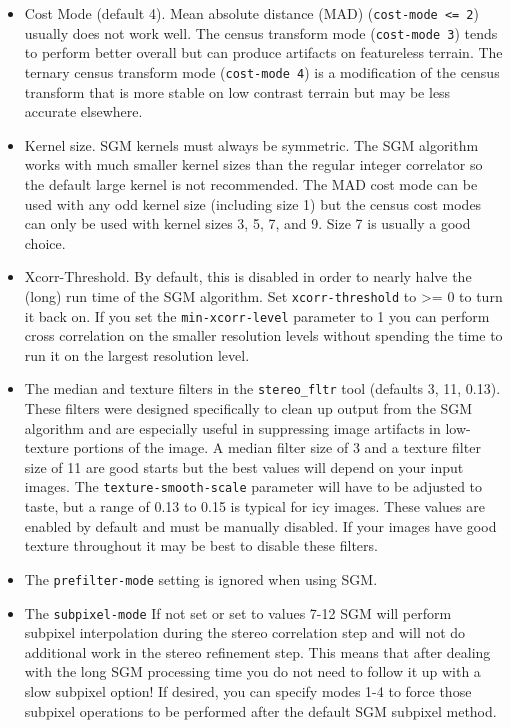 \begin{itemize}
\item Cost Mode (default 4).  Mean absolute distance (MAD) 
(\texttt{cost-mode <= 2}) usually does not work well.  
The census transform mode (\texttt{cost-mode 3}) \citep{zabih1994census} tends to 
perform better overall but can produce artifacts on featureless terrain.  
The ternary census transform mode (\texttt{cost-mode 4}) \citep{hua2016texture} 
is a modification of the census transform that is more stable on low contrast terrain
but may be less accurate elsewhere.
\item Kernel size.  SGM kernels must always be symmetric.
The SGM algorithm works with much smaller kernel sizes than the regular integer 
correlator so the default large kernel is not recommended.
The MAD cost mode can be used with any odd kernel size (including size 1) but the census 
cost modes can only be used with kernel sizes 3, 5, 7, and 9.  Size 7 is usually a good choice.
\item Xcorr-Threshold. By default, this is disabled in order to nearly halve the (long) run time of the SGM
algorithm.  Set \texttt{xcorr-threshold} to >= 0 to turn it back on.  If you set the
\texttt{min-xcorr-level} parameter to 1 you can perform cross correlation on the smaller resolution levels
without spending the time to run it on the largest resolution level.
\item The median and texture filters in the \texttt{stereo\_fltr} tool (defaults 3, 11, 0.13).  These filters
were designed specifically to clean up output from the SGM algorithm and are especially useful in suppressing
image artifacts in low-texture portions of the image.  A median filter size of 3 and a texture filter size of 11
are good starts but the best values will depend on your input images. The \texttt{texture-smooth-scale}
parameter will have to be adjusted to taste, but a range of 0.13 to 0.15 is typical for icy images.  These
values are enabled by default and must be manually disabled.  If your images have good texture throughout
it may be best to disable these filters.
\item The \texttt{prefilter-mode} setting is ignored when using SGM.
\item The \texttt{subpixel-mode} If not set or set to values 7-12 SGM will perform subpixel interpolation
during the stereo correlation step and will not do additional work in the stereo refinement step. This means that
after dealing with the long SGM processing time you do not need to follow it up with a slow subpixel option!
If desired, you can specify modes 1-4 to force those subpixel operations to be performed after the default
SGM subpixel method.
\end{itemize}

